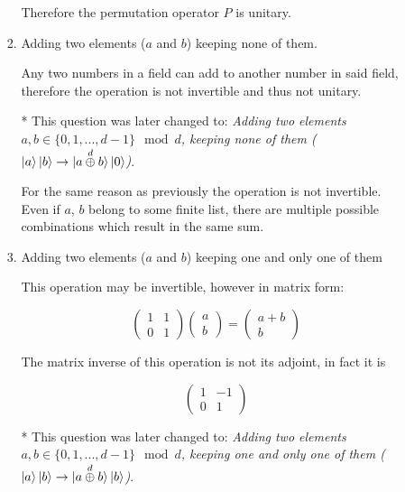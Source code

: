 \documentclass[11pt]{article}
\begin{document}
\begin{enumerate}[label*=\arabic*.]
\begin{enumerate}[label*=\arabic*.]
\begin{enumerate}[label=(\alph*)]
            Therefore the permutation operator $P$ is unitary.
            
            \item Adding two elements ($a$ and $b$) keeping none of them.

            Any two numbers in a field can add to another number in said field, therefore the operation is not invertible and thus not unitary.
            
            * This question was later changed to: \emph{Adding two elements $a, b \in \{0, 1, ..., d-1\} \mod d$, keeping none of them ($\ket{a}\ket{b} \rightarrow 
            |a\overset{d}{\oplus} b\rangle\ket{0}$)}.
            
            For the same reason as previously the operation is not invertible. Even if $a$, $b$ belong to some finite list, there are multiple possible combinations which result in the same sum.

            \item Adding two elements ($a$ and $b$) keeping one and only one of them

            This operation may be invertible, however in matrix form:

            $$
            \begin{pmatrix}
            1 & 1 \\
            0 & 1
            \end{pmatrix}
            \begin{pmatrix}
                a \\ b
            \end{pmatrix} =
            \begin{pmatrix}
                a+b \\ b
            \end{pmatrix}
            $$

            The matrix inverse of this operation is not its adjoint, in fact it is

            $$
            \begin{pmatrix}
                1 & -1\\
                0 & 1
            \end{pmatrix}
            $$

            * This question was later changed to: \emph{Adding two elements $a, b \in \{0, 1, ..., d-1\} \mod d$, keeping one and only one of them ($\ket{a}\ket{b} \rightarrow 
            |a\overset{d}{\oplus} b\rangle\ket{b}$)}.
            

\end{enumerate}
\end{enumerate}
\end{enumerate}
\end{document}
